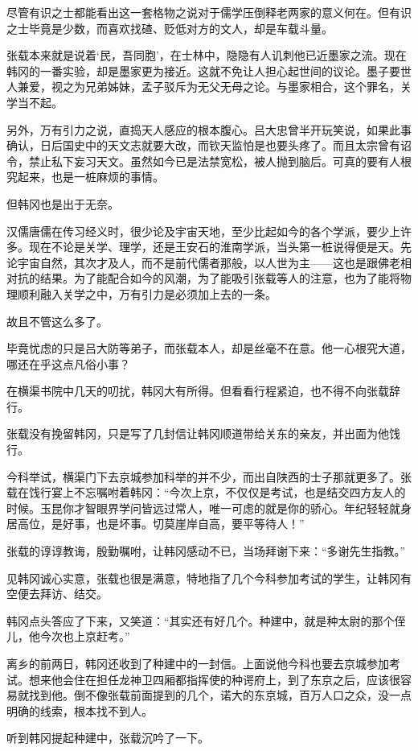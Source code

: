 尽管有识之士都能看出这一套格物之说对于儒学压倒释老两家的意义何在。但有识之士毕竟是少数，而喜欢找碴、贬低对方的文人，却是车载斗量。

张载本来就是说着‘民，吾同胞’，在士林中，隐隐有人讥刺他已近墨家之流。现在韩冈的一番实验，却是墨家更为接近。这就不免让人担心起世间的议论。墨子要世人兼爱，视之为兄弟姊妹，孟子驳斥为无父无母之论。与墨家相合，这个罪名，关学当不起。

另外，万有引力之说，直捣天人感应的根本腹心。吕大忠曾半开玩笑说，如果此事确认，日后国史中的天文志就要大改，而钦天监怕是也要头疼了。而且太宗曾有诏令，禁止私下妄习天文。虽然如今已是法禁宽松，被人抛到脑后。可真的要有人根究起来，也是一桩麻烦的事情。

但韩冈也是出于无奈。

汉儒唐儒在传习经义时，很少论及宇宙天地，至少比起如今的各个学派，要少上许多。现在不论是关学、理学，还是王安石的淮南学派，当头第一桩说得便是天。先论宇宙自然，其次才及人，而不是前代儒者那般，以人世为主——这也是跟佛老相对抗的结果。为了能配合如今的风潮，为了能吸引张载等人的注意，也为了能将物理顺利融入关学之中，万有引力是必须加上去的一条。

故且不管这么多了。

毕竟忧虑的只是吕大防等弟子，而张载本人，却是丝毫不在意。他一心根究大道，哪还在乎这点凡俗小事？

在横渠书院中几天的叨扰，韩冈大有所得。但看看行程紧迫，也不得不向张载辞行。

张载没有挽留韩冈，只是写了几封信让韩冈顺道带给关东的亲友，并出面为他饯行。

今科举试，横渠门下去京城参加科举的并不少，而出自陕西的士子那就更多了。张载在饯行宴上不忘嘱咐着韩冈：“今次上京，不仅仅是考试，也是结交四方友人的时候。玉昆你才智眼界学问皆远过常人，唯一可虑的就是你的骄心。年纪轻轻就身居高位，是好事，也是坏事。切莫崖岸自高，要平等待人！”

张载的谆谆教诲，殷勤嘱咐，让韩冈感动不已，当场拜谢下来：“多谢先生指教。”

见韩冈诚心实意，张载也很是满意，特地指了几个今科参加考试的学生，让韩冈有空便去拜访、结交。

韩冈点头答应了下来，又笑道：“其实还有好几个。种建中，就是种太尉的那个侄儿，他今次也上京赶考。”

离乡的前两日，韩冈还收到了种建中的一封信。上面说他今科也要去京城参加考试。想来他会住在担任龙神卫四厢都指挥使的种谔府上，到了东京之后，应该很容易就找到他。倒不像张载前面提到的几个，诺大的东京城，百万人口之众，没一点明确的线索，根本找不到人。

听到韩冈提起种建中，张载沉吟了一下。

